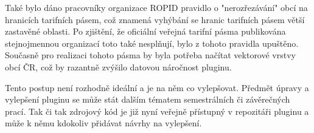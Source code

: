 Také bylo dáno pracovníky organizace ROPID pravidlo o "nerozřezávání" obcí na hranicích tarifních pásem,
což znamená vyhýbání se hranic tarifních pásem větší zastavěné oblasti.
Po zjištění, že oficiální veřejná tarifní pásma publikována stejnojmennou organizací toto také nesplňují,
bylo z tohoto pravidla upuštěno. Současně pro realizaci tohoto pásma by byla potřeba načítat vektorové vrstvy
obcí ČR, což by razantně zvýšilo datovou náročnost pluginu.

Tento postup není rozhodně ideální a je na něm co vylepšovat. Předmět úpravy a vylepšení pluginu
se může stát dalším tématem semestrálních či závěrečných prací. Tak či tak zdrojový kód
je již nyní veřejně přístupný v repozitáři pluginu a může k němu kdokoliv přidávat
návrhy na vylepšení.  


